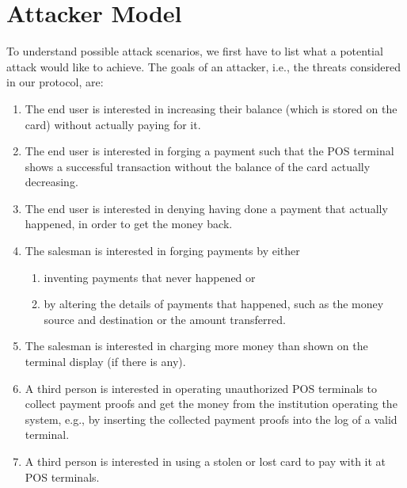 \section{Attacker Model}\label{attackerModel}
To understand possible attack scenarios, we first have to list what a potential attack would like to achieve.
The goals of an attacker, i.e., the threats considered in our protocol, are:
\begin{enumerate}[label={T\arabic*:}, leftmargin=2\parindent, ref={T\arabic*}]
    \item \label{threat:increaseWithoutPaying}
    The end user is interested in increasing their balance (which is stored on the card) without actually paying for it.
    
    \item \label{threat:payWithoutDecrease}
    The end user is interested in forging a payment such that the POS terminal shows a successful transaction without the balance of the card actually decreasing.
    
    \item \label{threat:denyPayment}
    The end user is interested in denying having done a payment that actually happened, in order to get the money back.
    
    \item \label{threat:forgingPayments} The salesman is interested in forging payments by either 
    \begin{enumerate}[ref={\theenumi~\alph*}]
        \item \label{threat:inventNewPayments}
        inventing payments that never happened or
        \item \label{threat:alterPaymentDetails}
        by altering the details of payments that happened, such as the money source and destination or the amount transferred.
    \end{enumerate}
        
    \item \label{threat:chargeMoreThanDisplayed}
    The salesman is interested in charging more money than shown on the terminal display (if there is any).

    \item \label{threat:invaldTermial} A third person is interested in operating unauthorized POS terminals to collect payment proofs and get the money from the institution operating the system, e.g., by inserting the collected payment proofs into the log of a valid terminal.

    \item \label{threat:stolenCard} A third person is interested in using a stolen or lost card to pay with it at POS terminals.
\end{enumerate}

